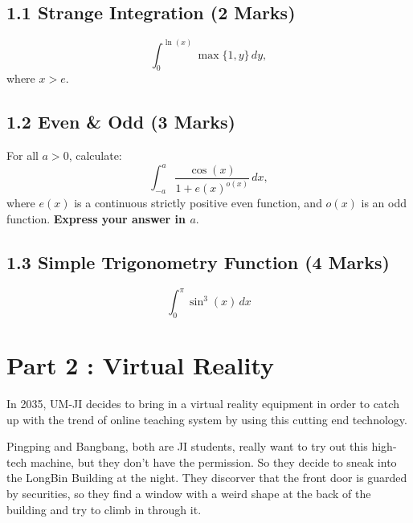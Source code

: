 \documentclass[12pt]{article}
\begin{document}
\subsection*{1.1 Strange Integration (2 Marks)}
\begin{equation*}
    \int^{\ln(x)}_0 \max \{1, y\}\,dy, 
\end{equation*}
where $x > e$.

\subsection*{1.2 Even \& Odd (3 Marks)}
\par For all $a>0$, calculate:
\begin{equation*}
    \int^a_{-a} \frac{\cos(x)}{1 + e(x)^{o(x)}}\,dx, 
\end{equation*}
where $e(x)$ is a continuous strictly positive even function, and $o(x)$ is an odd function. \textbf{Express your answer in $a$}. 

\subsection*{1.3 Simple Trigonometry Function (4 Marks)}
\begin{equation*}
    \int^\pi_0 \sin^3(x)\,dx
\end{equation*}

\newpage
\section*{Part 2 : Virtual Reality}
\par In 2035, UM-JI decides to bring in a virtual reality equipment in order to catch up with the trend of online 
teaching system by using this cutting end technology.

\par Pingping and Bangbang, both are JI students, really want to try out this high-tech machine, but they don't have the
permission. So they decide to sneak into the LongBin Building at the night. They discorver that the front door is 
guarded by securities, so they find a window with a weird shape at the back of the building and try to
climb in through it. 
\end{document}
